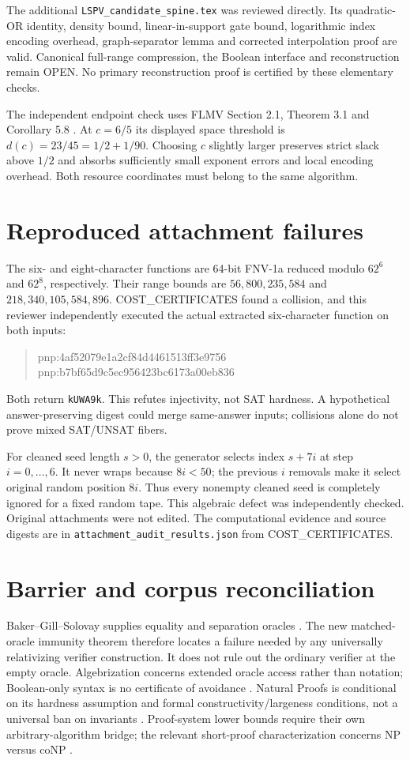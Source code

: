 \documentclass[11pt]{article}
\begin{document}
The additional \texttt{LSPV\_candidate\_spine.tex} was reviewed directly.
Its quadratic-OR identity, density bound, linear-in-support gate bound,
logarithmic index encoding overhead, graph-separator lemma and corrected
interpolation proof are valid. Canonical full-range compression, the Boolean
interface and reconstruction remain OPEN. No primary reconstruction proof
is certified by these elementary checks.

The independent endpoint check uses FLMV Section 2.1, Theorem 3.1 and
Corollary 5.8 \cite{flmv}. At $c=6/5$ its displayed space threshold is
$d(c)=23/45=1/2+1/90$. Choosing $c$ slightly larger preserves strict slack
above $1/2$ and absorbs sufficiently small exponent errors and local encoding
overhead. Both resource coordinates must belong to the same algorithm.

\section*{Reproduced attachment failures}
The six- and eight-character functions are 64-bit FNV-1a reduced modulo
$62^6$ and $62^8$, respectively. Their range bounds are
$56{,}800{,}235{,}584$ and $218{,}340{,}105{,}584{,}896$.
COST\_CERTIFICATES found a collision, and this reviewer independently
executed the actual extracted six-character function on both inputs:
\begin{quote}\ttfamily
pnp:4af52079e1a2cf84d4461513ff3e9756\\
pnp:b7bf65d9c5ec956423bc6173a00eb836
\end{quote}
Both return \texttt{kUWA9k}. This refutes injectivity, not SAT hardness.
A hypothetical answer-preserving digest could merge same-answer inputs;
collisions alone do not prove mixed SAT/UNSAT fibers.

For cleaned seed length $s>0$, the generator selects index $s+7i$ at step
$i=0,\ldots,6$. It never wraps because $8i<50$; the previous $i$ removals
make it select original random position $8i$. Thus every nonempty cleaned
seed is completely ignored for a fixed random tape. This algebraic defect
was independently checked. Original attachments were not edited.
The computational evidence and source digests are in
\texttt{attachment\_audit\_results.json} from COST\_CERTIFICATES.

\section*{Barrier and corpus reconciliation}
Baker--Gill--Solovay supplies equality and separation oracles \cite{bgs}.
The new matched-oracle immunity theorem therefore locates a failure needed
by any universally relativizing verifier construction. It does not rule out
the ordinary verifier at the empty oracle.
Algebrization concerns extended oracle access rather than notation;
Boolean-only syntax is no certificate of avoidance \cite{aw}.
Natural Proofs is conditional on its hardness assumption and formal
constructivity/largeness conditions, not a universal ban on invariants
\cite{rr}. Proof-system lower bounds require their own arbitrary-algorithm
bridge; the relevant short-proof characterization concerns NP versus coNP
\cite{cr}.
\end{document}
